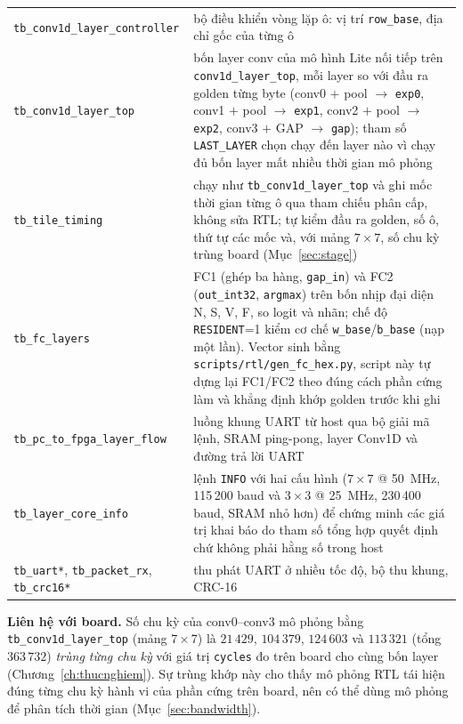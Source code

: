 \begin{table}[htbp]
\begin{tabular}{@{}>{\raggedright\arraybackslash}p{4.4cm}>{\raggedright\arraybackslash}p{10.7cm}@{}}
\texttt{tb\_conv1d\_layer\_controller} & bộ điều khiển vòng lặp ô: vị trí \texttt{row\_base}, địa chỉ gốc của từng ô \\
\texttt{tb\_conv1d\_layer\_top} & bốn layer conv của mô hình Lite nối tiếp trên \texttt{conv1d\_layer\_top}, mỗi layer so với đầu ra golden từng byte (conv0 $+$ pool $\to$ \texttt{exp0}, conv1 $+$ pool $\to$ \texttt{exp1}, conv2 $+$ pool $\to$ \texttt{exp2}, conv3 $+$ GAP $\to$ \texttt{gap}); tham số \texttt{LAST\_LAYER} chọn chạy đến layer nào vì chạy đủ bốn layer mất nhiều thời gian mô phỏng \\
\texttt{tb\_tile\_timing} & chạy như \texttt{tb\_conv1d\_layer\_top} và ghi mốc thời gian từng ô qua tham chiếu phân cấp, không sửa RTL; tự kiểm đầu ra golden, số ô, thứ tự các mốc và, với mảng $7\times7$, số chu kỳ trùng board (Mục~\ref{sec:stage}) \\
\texttt{tb\_fc\_layers} & FC1 (ghép ba hàng, \texttt{gap\_in}) và FC2 (\texttt{out\_int32}, \texttt{argmax}) trên bốn nhịp đại diện N, S, V, F, so logit và nhãn; chế độ \texttt{RESIDENT}=1 kiểm cơ chế \texttt{w\_base}/\texttt{b\_base} (nạp một lần). Vector sinh bằng \texttt{scripts/rtl/gen\_fc\_hex.py}, script này tự dựng lại FC1/FC2 theo đúng cách phần cứng làm và khẳng định khớp golden trước khi ghi \\
\texttt{tb\_pc\_to\_fpga\_layer\_flow} & luồng khung UART từ host qua bộ giải mã lệnh, SRAM ping-pong, layer Conv1D và đường trả lời UART \\
\texttt{tb\_layer\_core\_info} & lệnh \texttt{INFO} với hai cấu hình ($7\times7$ @ 50~MHz, 115\,200 baud và $3\times3$ @ 25~MHz, 230\,400 baud, SRAM nhỏ hơn) để chứng minh các giá trị khai báo do tham số tổng hợp quyết định chứ không phải hằng số trong host \\
\texttt{tb\_uart*}, \texttt{tb\_packet\_rx}, \texttt{tb\_crc16*} & thu phát UART ở nhiều tốc độ, bộ thu khung, CRC-16 \\ \bottomrule
\end{tabular}
\end{table}

\textbf{Liên hệ với board.} Số chu kỳ của conv0--conv3 mô phỏng bằng \texttt{tb\_conv1d\_layer\_top} (mảng $7\times7$) là $21\,429$, $104\,379$, $124\,603$ và $113\,321$ (tổng $363\,732$) \emph{trùng từng chu kỳ} với giá trị \texttt{cycles} đo trên board cho cùng bốn layer (Chương~\ref{ch:thucnghiem}).
Sự trùng khớp này cho thấy mô phỏng RTL tái hiện đúng từng chu kỳ hành vi của phần cứng trên board, nên có thể dùng mô phỏng để phân tích thời gian (Mục~\ref{sec:bandwidth}).

